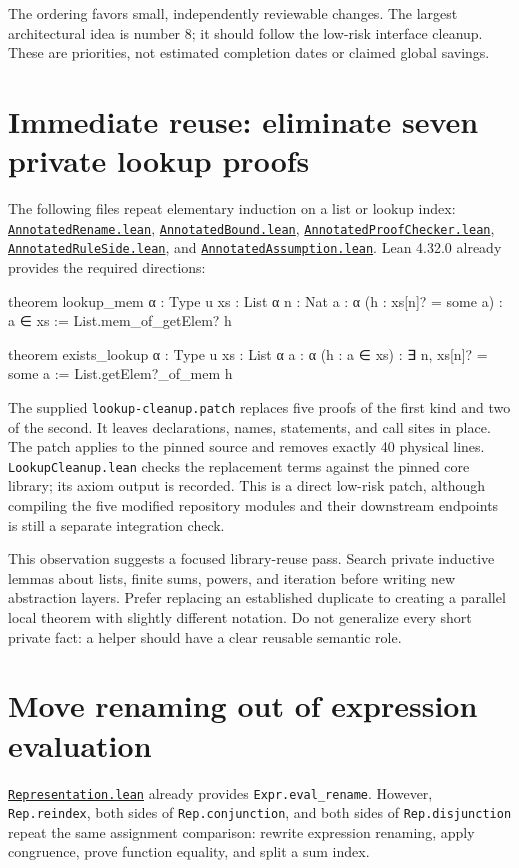 \documentclass[11pt,letterpaper]{article}
\newcommand{\code}[1]{\nolinkurl{#1}}
\newcommand{\src}[2]{\href{https://github.com/VladimirReshetnikov/ProveIt/blob/60e9c5d620c6c387d932876cfa2d9376f64ea56c/Computability/DiophantineConsistency/Lean/DiophantineConsistency/#1.lean}{\code{#1.lean}}#2}
\begin{document}
The ordering favors small, independently reviewable changes. The largest
architectural idea is number 8; it should follow the low-risk interface cleanup.
These are priorities, not estimated completion dates or claimed global savings.

\section{Immediate reuse: eliminate seven private lookup proofs}

The following files repeat elementary induction on a list or lookup index:
\src{AnnotatedRename}{, }
\src{AnnotatedBound}{, }
\src{AnnotatedProofChecker}{, }
\src{AnnotatedRuleSide}{, and }
\src{AnnotatedAssumption}{.}
Lean 4.32.0 already provides the required directions:

\begin{Lean}
theorem lookup_mem {α : Type u} {xs : List α}
    {n : Nat} {a : α} (h : xs[n]? = some a) : a ∈ xs :=
  List.mem_of_getElem? h

theorem exists_lookup {α : Type u} {xs : List α}
    {a : α} (h : a ∈ xs) : ∃ n, xs[n]? = some a :=
  List.getElem?_of_mem h
\end{Lean}

The supplied \code{lookup-cleanup.patch} replaces five proofs of the first
kind and two of the second. It leaves declarations, names, statements, and
call sites in place. The patch applies to the pinned source and removes
exactly 40 physical lines. \code{LookupCleanup.lean} checks the replacement
terms against the pinned core library; its axiom output is recorded.
This is a direct low-risk patch, although compiling the five modified
repository modules and their downstream endpoints is still a separate
integration check.\cite{lean-list}

This observation suggests a focused library-reuse pass. Search private
inductive lemmas about lists, finite sums, powers, and iteration before writing
new abstraction layers. Prefer replacing an established duplicate to creating
a parallel local theorem with slightly different notation. Do not generalize
every short private fact: a helper should have a clear reusable semantic role.

\section{Move renaming out of expression evaluation}

\src{Representation}{ already provides \code{Expr.eval_rename}.}
However, \code{Rep.reindex}, both sides of \code{Rep.conjunction}, and both
sides of \code{Rep.disjunction} repeat the same assignment comparison:
rewrite expression renaming, apply congruence, prove function equality, and
split a sum index.
\end{document}
